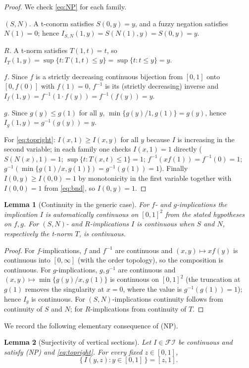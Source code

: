 \documentclass{amsart}
\theoremstyle{plain}
\newtheorem{lemma}{Lemma}
\theoremstyle{definition}
\newcommand{\FI}{\mathcal{FI}}
\begin{document}
\begin{proof}
We check \eqref{eq:NP} for each family.

\emph{$(S,N)$.} A t-conorm satisfies $S(0,y)=y$, and a fuzzy negation satisfies $N(1)=0$;
hence $I_{S,N}(1,y)=S(N(1),y)=S(0,y)=y$.

\emph{$R$.} A t-norm satisfies $T(1,t)=t$, so
$I_T(1,y)=\sup\{t:T(1,t)\le y\}=\sup\{t:t\le y\}=y$.

\emph{$f$.} Since $f$ is a strictly decreasing continuous bijection from $[0,1]$ onto
$[0,f(0)]$ with $f(1)=0$, $f^{-1}$ is its (strictly decreasing) inverse and
$I_f(1,y)=f^{-1}(1\cdot f(y))=f^{-1}(f(y))=y$.

\emph{$g$.} Since $g(y)\le g(1)$ for all $y$, $\min\{g(y)/1,g(1)\}=g(y)$, hence
$I_g(1,y)=g^{-1}(g(y))=y$.

For \eqref{eq:topright}: $I(x,1)\ge I(x,y)$ for all $y$ because $I$ is increasing in the
second variable; in each family one checks $I(x,1)=1$ directly
($S(N(x),1)=1$; $\sup\{t:T(x,t)\le 1\}=1$; $f^{-1}(x f(1))=f^{-1}(0)=1$;
$g^{-1}(\min\{g(1)/x,g(1)\})=g^{-1}(g(1))=1$). Finally $I(0,y)\ge I(0,0)=1$ by
monotonicity in the first variable together with $I(0,0)=1$ from \eqref{eq:bnd}, so
$I(0,y)=1$.
\end{proof}

\begin{lemma}[Continuity in the generic case]\label{lem:cont}
For $f$- and $g$-implications the implication $I$ is automatically continuous on
$[0,1]^2$ from the stated hypotheses on $f,g$.  For $(S,N)$- and $R$-implications $I$ is
continuous when $S$ and $N$, respectively the t-norm $T$, is continuous.
\end{lemma}

\begin{proof}
For $f$-implications, $f$ and $f^{-1}$ are continuous and $(x,y)\mapsto x f(y)$ is
continuous into $[0,\infty]$ (with the order topology), so the composition is continuous.
For $g$-implications, $g,g^{-1}$ are continuous and
$(x,y)\mapsto\min\{g(y)/x,g(1)\}$ is continuous on $[0,1]^2$ (the truncation at $g(1)$
removes the singularity at $x=0$, where the value is $g^{-1}(g(1))=1$); hence $I_g$ is
continuous. For $(S,N)$-implications continuity follows from continuity of $S$ and $N$;
for $R$-implications from continuity of $T$.
\end{proof}

We record the following elementary consequence of (NP).

\begin{lemma}[Surjectivity of vertical sections]\label{lem:surj}
Let $I\in\FI$ be continuous and satisfy \textup{(NP)} and \eqref{eq:topright}. For every
fixed $z\in[0,1]$,
\[
\{\,I(y,z):y\in[0,1]\,\}=[z,1].
\]
\end{lemma}
\end{document}
